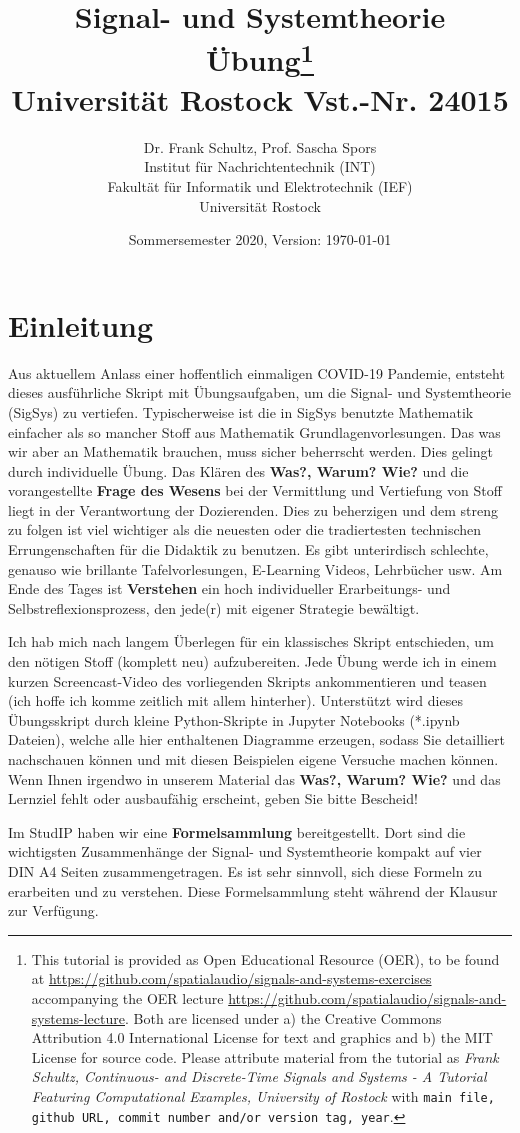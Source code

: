 \documentclass[11pt,a4paper,DIV=12]{scrartcl}
\title{Signal- und Systemtheorie\\
Übung\thanks{
This tutorial is provided as Open Educational Resource (OER), to be found at
\url{https://github.com/spatialaudio/signals-and-systems-exercises}
accompanying the OER lecture
\url{https://github.com/spatialaudio/signals-and-systems-lecture}.
%
Both are licensed under a) the Creative Commons Attribution 4.0 International
License for text and graphics and b) the MIT License for source code.
%
Please attribute material from the tutorial as \textit{Frank Schultz,
Continuous- and Discrete-Time Signals and Systems - A Tutorial Featuring
Computational Examples, University of Rostock} with
\texttt{main file, github URL, commit number and/or version tag, year}.
}
\\
\small Universität Rostock Vst.-Nr. 24015}
\author{Dr. Frank Schultz, Prof. Sascha Spors\\
\small Institut für Nachrichtentechnik (INT)\\
\small Fakultät für Informatik und Elektrotechnik (IEF)\\
\small Universität Rostock
}
\date{Sommersemester 2020, Version: \today}
\numberwithin{equation}{section}
\numberwithin{figure}{section}
\begin{document}
\maketitle
\tableofcontents
\section*{Einleitung}
%
Aus aktuellem Anlass einer hoffentlich einmaligen COVID-19 Pandemie, entsteht
dieses ausführliche Skript mit Übungsaufgaben, um die Signal- und Systemtheorie
(SigSys) zu vertiefen.
%
Typischerweise ist die in SigSys benutzte Mathematik einfacher als so mancher Stoff
aus Mathematik Grundlagenvorlesungen.
%
Das was wir aber an Mathematik brauchen, muss sicher beherrscht werden.
%
Dies gelingt durch individuelle Übung.
%
Das Klären des \textbf{Was?, Warum? Wie?} und die vorangestellte \textbf{Frage des Wesens}
bei der Vermittlung und Vertiefung von Stoff liegt in der
Verantwortung der Dozierenden.
%
Dies zu beherzigen und dem streng zu folgen ist viel wichtiger als die neuesten
oder die tradiertesten technischen Errungenschaften für die Didaktik zu benutzen.
%
Es gibt unterirdisch schlechte, genauso wie brillante Tafelvorlesungen,
E-Learning Videos, Lehrbücher usw.
%
Am Ende des Tages ist \textbf{Verstehen} ein hoch individueller Erarbeitungs-
und Selbstreflexionsprozess, den jede(r) mit eigener Strategie bewältigt.
%

Ich hab mich nach langem Überlegen für ein klassisches Skript entschieden,
um den nötigen Stoff (komplett neu) aufzubereiten.
%
Jede Übung werde ich in einem kurzen Screencast-Video des vorliegenden Skripts
ankommentieren und teasen (ich hoffe ich komme zeitlich mit allem hinterher).
%
Unterstützt wird dieses Übungsskript durch kleine Python-Skripte in
Jupyter Notebooks (*.ipynb Dateien),
welche alle hier enthaltenen Diagramme erzeugen, sodass Sie
detailliert nachschauen können und mit diesen Beispielen eigene Versuche machen
können.
%
Wenn Ihnen irgendwo in unserem Material das \textbf{Was?, Warum? Wie?} und das
Lernziel fehlt oder ausbaufähig erscheint, geben Sie bitte Bescheid!

Im StudIP haben wir eine \textbf{Formelsammlung} bereitgestellt. Dort sind die
wichtigsten Zusammenhänge der Signal- und Systemtheorie kompakt auf vier DIN A4
Seiten zusammengetragen. Es ist sehr sinnvoll, sich diese Formeln zu erarbeiten
und zu verstehen. Diese Formelsammlung steht während der Klausur zur Verfügung.
\end{document}
